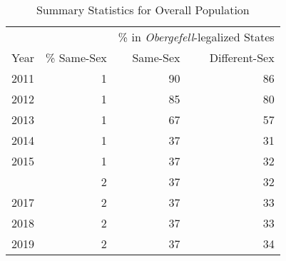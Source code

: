 \begin{table}[htbp]

\caption{Summary Statistics for Overall Population}
\label{tab:overall_table}
\centering
\begin{tabular}[t]{rrrr}
\toprule
\multicolumn{2}{c}{ } & \multicolumn{2}{c}{\% in \textit{Obergefell}-legalized States} \\
\cmidrule(l{3pt}r{3pt}){3-4}
Year & \% Same-Sex & Same-Sex & Different-Sex\\
\midrule
2011 & 1 & 90 & 86\\
2012 & 1 & 85 & 80\\
2013 & 1 & 67 & 57\\
2014 & 1 & 37 & 31\\
2015 & 1 & 37 & 32\\
\addlinespace
2016 & 2 & 37 & 32\\
2017 & 2 & 37 & 33\\
2018 & 2 & 37 & 33\\
2019 & 2 & 37 & 34\\
\bottomrule
\end{tabular}
\end{table}

